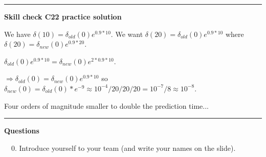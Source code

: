 \documentclass[12pt,letterpaper,noanswers]{exam}
\begin{document}
\vspace{0.2cm}

\hrule
\vspace{0.2cm}

\noindent\textbf{Skill check C22 practice solution}

We have $\delta(10) = \delta_{old}(0) e^{0.9*10}$.  We want $\delta(20) = \delta_{old}(0)e^{0.9*10}$ where $\delta(20) = \delta_{new}(0)e^{0.9*20}$.

$\delta_{old}(0) e^{0.9*10} = \delta_{new}(0)e^{2*0.9*10}$.

$\Rightarrow \delta_{old}(0) = \delta_{new}(0)e^{0.9*10}$ so $\delta_{new}(0) = \delta_{old}(0)*e^{-9}\approx 10^{-4}/20/20/20 = 10^{-7}/8\approx 10^{-8}$.

Four orders of magnitude smaller to double the prediction time...

\vspace{0.2cm}

\hrule
\vspace{0.2cm}
\noindent\textbf{Questions}

\noindent \ \ 0.  Introduce yourself to your team (and write your names on the slide).
\end{document}

